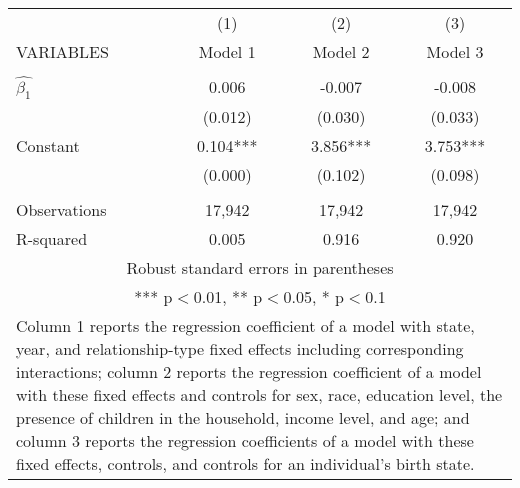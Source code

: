 \begin{tabular}{lccc}
\hline
 & (1) & (2) & (3) \\
VARIABLES & Model 1 & Model 2 & Model 3 \\ \hline
 &  &  &  \\
$\hat{\beta_1}$ & 0.006 & -0.007 & -0.008 \\
 & (0.012) & (0.030) & (0.033) \\
Constant & 0.104*** & 3.856*** & 3.753*** \\
 & (0.000) & (0.102) & (0.098) \\
 &  &  &  \\
Observations & 17,942 & 17,942 & 17,942 \\
 R-squared & 0.005 & 0.916 & 0.920 \\ \hline
\multicolumn{4}{c}{ Robust standard errors in parentheses} \\
\multicolumn{4}{c}{ *** p$<$0.01, ** p$<$0.05, * p$<$0.1} \\
\multicolumn{4}{p{0.8\linewidth}}{\small Column 1 reports the regression coefficient of a model with state, year, and relationship-type fixed effects including corresponding interactions; column 2 reports the regression coefficient of a model with these fixed effects and controls for sex, race, education level, the presence of children in the household, income level, and age; and column 3 reports the regression coefficients of a model with these fixed effects, controls, and controls for an individual’s birth state.} \\
\end{tabular}
